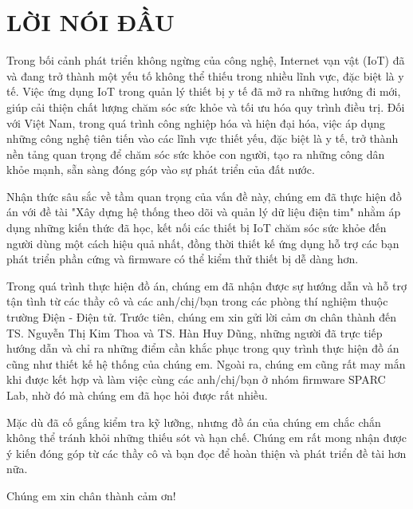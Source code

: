 \section*{LỜI NÓI ĐẦU} %
\thispagestyle{empty}
Trong bối cảnh phát triển không ngừng của công nghệ, Internet vạn vật (IoT) đã và đang trở thành một yếu tố không thể thiếu trong nhiều lĩnh vực, đặc biệt là y tế. Việc ứng dụng IoT trong quản lý thiết bị y tế đã mở ra những hướng đi mới, giúp cải thiện chất lượng chăm sóc sức khỏe và tối ưu hóa quy trình điều trị. Đối với Việt Nam, trong quá trình công nghiệp hóa và hiện đại hóa, việc áp dụng những công nghệ tiên tiến vào các lĩnh vực thiết yếu, đặc biệt là y tế, trở thành nền tảng quan trọng để chăm sóc sức khỏe con người, tạo ra những công dân khỏe mạnh, sẵn sàng đóng góp vào sự phát triển của đất nước.

Nhận thức sâu sắc về tầm quan trọng của vấn đề này, chúng em đã thực hiện đồ án với đề tài "Xây dựng hệ thống theo dõi và quản lý dữ liệu điện tim" nhằm áp dụng những kiến thức đã học, kết nối các thiết bị IoT chăm sóc sức khỏe đến người dùng một cách hiệu quả nhất, đồng thời thiết kế ứng dụng hỗ trợ các bạn phát triển phần cứng và firmware có thể kiểm thử thiết bị dễ dàng hơn.

Trong quá trình thực hiện đồ án, chúng em đã nhận được sự hướng dẫn và hỗ trợ tận tình từ các thầy cô và các anh/chị/bạn trong các phòng thí nghiệm thuộc trường Điện - Điện tử. Trước tiên, chúng em xin gửi lời cảm ơn chân thành đến TS. Nguyễn Thị Kim Thoa và TS. Hàn Huy Dũng, những người đã trực tiếp hướng dẫn và chỉ ra những điểm cần khắc phục trong quy trình thực hiện đồ án cũng như thiết kế hệ thống của chúng em. Ngoài ra, chúng em cũng rất may mắn khi được kết hợp và làm việc cùng các anh/chị/bạn ở nhóm firmware SPARC Lab, nhờ đó mà chúng em đã học hỏi được rất nhiều.

Mặc dù đã cố gắng kiểm tra kỹ lưỡng, nhưng đồ án của chúng em chắc chắn không thể tránh khỏi những thiếu sót và hạn chế. Chúng em rất mong nhận được ý kiến đóng góp từ các thầy cô và bạn đọc để hoàn thiện và phát triển đề tài hơn nữa.



Chúng em xin chân thành cảm ơn! 



\cleardoublepage
